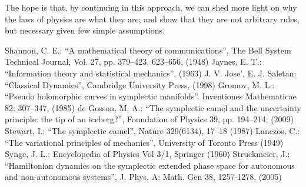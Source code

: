 \documentclass[aps,pra,10pt,twocolumn,floatfix,nofootinbib]{revtex4-1}
\theoremstyle{definition}
\begin{document}
The hope is that, by continuing in this approach, we can shed more light on why the laws of physics are what they are; and show that they are not arbitrary rules, but necessary given few simple assumptions.

\begin{thebibliography}{0}

 Shannon, C. E.: ``A mathematical theory of communications'', The Bell System Technical Journal, Vol. 27, pp. 379–423, 623–656, (1948)
 Jaynes, E. T.: ``Information theory and statistical mechanics'', (1963)
 J. V. Jose', E. J. Saletan: ``Classical Dynamics'', Cambridge University Press, (1998)
 Gromov, M. L.: ``Pseudo holomorphic curves in symplectic manifolds''. Inventiones Mathematicae 82: 307–347, (1985)
 de Gosson, M. A.: ``The symplectic camel and the uncertainty principle: the tip of an iceberg?'', Foundation of Physics 39, pp. 194–214, (2009)
 Stewart, I.: ``The symplectic camel'', Nature 329(6134), 17–18 (1987)
 Lanczos, C.: ``The variational principles of mechanics'', University of Toronto Press (1949)
 Synge, J. L.: Encyclopedia of Physics Vol 3/1, Springer (1960)
 Struckmeier, J.: ``Hamiltonian dynamics on the symplectic extended phase space for autonomous and non-autonomous systems'', J. Phys. A: Math. Gen 38, 1257-1278, (2005)

\end{thebibliography}
\end{document}
